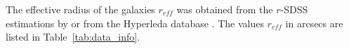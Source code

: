 \documentclass[useAMS,usenatbib]{mnras}
\newcommand{\kms}{\,\mbox{km}\,\mbox{s}^{-1}}
\begin{document}
The effective radius of the  galaxies $r_{eff}$   was obtained from the $r$-SDSS  estimations by  \citet{Reshetnikov2015} or from the Hyperleda database \citep{Leda}. The values  $r_{eff}$ in arcsecs are listed in Table~\ref{tab:data_info}.%




%
\end{document}
